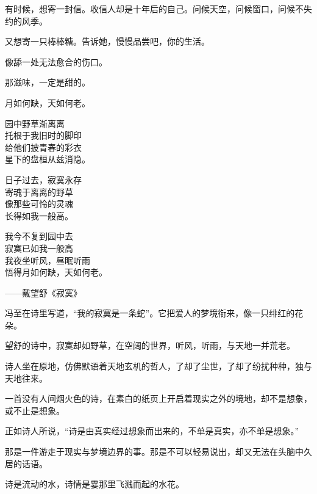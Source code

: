 \documentclass[12pt,a4paper]{article}
\begin{document}
		有时候，想寄一封信。收信人却是十年后的自己。问候天空，问候窗口，问候不失约的风季。

		又想寄一只棒棒糖。告诉她，慢慢品尝吧，你的生活。\par
		像舔一处无法愈合的伤口。

		那滋味，一定是甜的。

	\endwriting



		月如何缺，天如何老。

		\longpoem{}{}{}
		园中野草渐离离 \\
		托根于我旧时的脚印 \\
		给他们披青春的彩衣 \\
		星下的盘桓从兹消隐。

		日子过去，寂寞永存 \\
		寄魂于离离的野草 \\
		像那些可怜的灵魂 \\
		长得如我一般高。

		我今不复到园中去 \\
		寂寞已如我一般高 \\
		我夜坐听风，昼眠听雨 \\
		悟得月如何缺，天如何老。

		\begin{flushright}
			——戴望舒《寂寞》
		\end{flushright}
		\endlongpoem

		冯至在诗里写道，“我的寂寞是一条蛇”。它把爱人的梦境衔来，像一只绯红的花朵。\par
		望舒的诗中，寂寞却如野草，在空阔的世界，听风，听雨，与天地一并荒老。\par
		诗人坐在原地，仿佛默语着天地玄机的哲人，了却了尘世，了却了纷扰种种，独与天地往来。\par
		一首没有人间烟火色的诗，在素白的纸页上开启着现实之外的境地，却不是想象，或不止是想象。\par
		正如诗人所说，“诗是由真实经过想象而出来的，不单是真实，亦不单是想象。”\par
		那是一件游走于现实与梦境边界的事。那是不可以轻易说出，却又无法在头脑中久居的话语。\par
		诗是流动的水，诗情是霎那里飞溅而起的水花。
\end{document}
